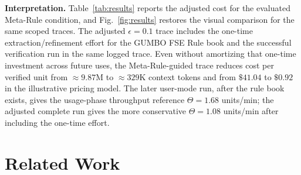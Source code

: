 \documentclass[conference]{IEEEtran}
\begin{document}
\noindent\textbf{Interpretation.}
 Table~\ref{tab:results} reports the adjusted cost for the evaluated Meta-Rule condition, and Fig.~\ref{fig:results} restores the visual comparison for the same scoped traces. The adjusted $\epsilon=0.1$ trace includes the one-time extraction/refinement effort for the GUMBO FSE Rule book and the successful verification run in the same logged trace. Even without amortizing that one-time investment across future uses, the Meta-Rule-guided trace reduces cost per verified unit from $\approx9.87$M to $\approx329$K context tokens and from $\$41.04$ to $\$0.92$ in the illustrative pricing model. The later user-mode run, after the rule book exists, gives the usage-phase throughput reference $\Theta=1.68$ units/min; the adjusted complete run gives the more conservative $\Theta=1.08$ units/min after including the one-time effort. %


\section{Related Work}
\label{sec:related-work}


\end{document}
